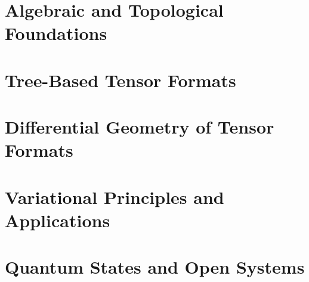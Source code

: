 \documentclass[12pt, a4paper, twoside, openright]{book}
\theoremstyle{plain}
\theoremstyle{definition}
\theoremstyle{remark}
\begin{document}
\mainmatter

\part{Algebraic and Topological Foundations}
\label{part:foundations}






\part{Tree-Based Tensor Formats}
\label{part:tree}





\part{Differential Geometry of Tensor Formats}
\label{part:geometry}




\part{Variational Principles and Applications}
\label{part:variational}



\part{Quantum States and Open Systems}
\label{part:quantum}







\appendix







\backmatter




\printindex
\end{document}
